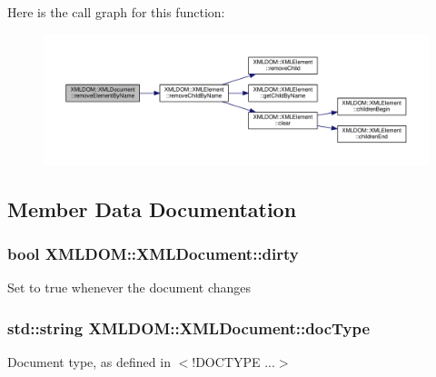 Here is the call graph for this function\+:
\nopagebreak
\begin{figure}[H]
\begin{center}
\leavevmode
\includegraphics[width=350pt]{da/db8/classXMLDOM_1_1XMLDocument_afc5d54ab623bafee4c186c9c87f6c485_cgraph}
\end{center}
\end{figure}




\subsection{Member Data Documentation}
\subsubsection[{\texorpdfstring{dirty}{dirty}}]{\setlength{\rightskip}{0pt plus 5cm}bool X\+M\+L\+D\+O\+M\+::\+X\+M\+L\+Document\+::dirty}\hypertarget{classXMLDOM_1_1XMLDocument_a2b263e2cc905fc03b178f9c4995802be}{}\label{classXMLDOM_1_1XMLDocument_a2b263e2cc905fc03b178f9c4995802be}
Set to true whenever the document changes 
\subsubsection[{\texorpdfstring{doc\+Type}{docType}}]{\setlength{\rightskip}{0pt plus 5cm}std\+::string X\+M\+L\+D\+O\+M\+::\+X\+M\+L\+Document\+::doc\+Type}\hypertarget{classXMLDOM_1_1XMLDocument_adc77c2e1652bb0dfb840de4149ac45f2}{}\label{classXMLDOM_1_1XMLDocument_adc77c2e1652bb0dfb840de4149ac45f2}
Document type, as defined in $<$!\+D\+O\+C\+T\+Y\+PE ...$>$ 

